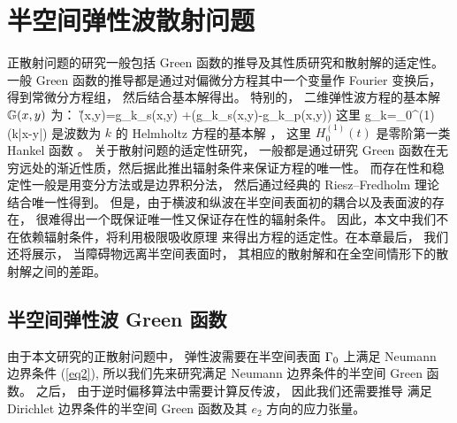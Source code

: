 \chapter{半空间弹性波散射问题}\label{chap:Elastic}
正散射问题的研究一般包括 Green 函数的推导及其性质研究和散射解的适定性。 一般 Green 函数的推导都是通过对偏微分方程其中一个变量作 Fourier 变换后，得到常微分方程组， 然后结合基本解得出。 特别的， 二维弹性波方程的基本解 $\mathbb{G}(x,y)$ \cite{ku63} 为：
\ben
\G(x,y)=g_{k_s}(x,y)  \I+\nabla\nabla(g_{k_s}(x,y)-g_{k_p}(x,y))
\een
这里
\ben
g_{k}=_0^{(1)}(k|x-y|)
\een
是波数为 $k$ 的 Helmholtz 方程的基本解 \cite{colton-kress}， 这里 $\mathit{H}_0^{(1)}(t)$ 是零阶第一类 Hankel 函数 \cite{watson1995treatise}。 关于散射问题的适定性研究， 一般都是通过研究 Green 函数在无穷远处的渐近性质，然后据此推出辐射条件来保证方程的唯一性。 而存在性和稳定性一般是用变分方法或是边界积分法， 然后通过经典的 Riesz–Fredholm 理论 \cite{colton2013integral,kress1989linear} 结合唯一性得到。 但是，由于横波和纵波在半空间表面初的耦合以及表面波的存在， 很难得出一个既保证唯一性又保证存在性的辐射条件。 因此，本文中我们不在依赖辐射条件，将利用极限吸收原理 \cite{agmon1975spectral,Yves1988} 来得出方程的适定性。在本章最后， 我们还将展示， 当障碍物远离半空间表面时， 其相应的散射解和在全空间情形下的散射解之间的差距。

\section{半空间弹性波 Green 函数}\label{Green Tensor}
由于本文研究的正散射问题中， 弹性波需要在半空间表面 $\Gamma_0$ 上满足 Neumann 边界条件 (\ref{eq2}), 所以我们先来研究满足 Neumann 边界条件的半空间 Green 函数。 之后， 由于逆时偏移算法中需要计算反传波， 因此我们还需要推导 满足 Dirichlet 边界条件的半空间 Green 函数及其 $e_2$ 方向的应力张量。
